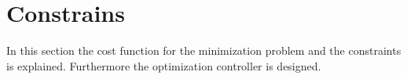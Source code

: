 \section{Constrains}

In this section the cost function for the minimization problem and the constraints is explained. Furthermore the optimization controller is designed. 


